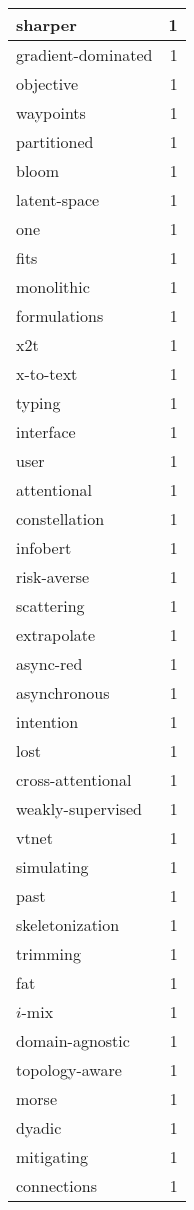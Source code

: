 \begin{table}[h]
\begin{tabular}{|l|r|}
\hline
sharper & 1 \\
\hline
gradient-dominated & 1 \\
\hline
objective & 1 \\
\hline
waypoints & 1 \\
\hline
partitioned & 1 \\
\hline
bloom & 1 \\
\hline
latent-space & 1 \\
\hline
one & 1 \\
\hline
fits & 1 \\
\hline
monolithic & 1 \\
\hline
formulations & 1 \\
\hline
x2t & 1 \\
\hline
x-to-text & 1 \\
\hline
typing & 1 \\
\hline
interface & 1 \\
\hline
user & 1 \\
\hline
attentional & 1 \\
\hline
constellation & 1 \\
\hline
infobert & 1 \\
\hline
risk-averse & 1 \\
\hline
scattering & 1 \\
\hline
extrapolate & 1 \\
\hline
async-red & 1 \\
\hline
asynchronous & 1 \\
\hline
intention & 1 \\
\hline
lost & 1 \\
\hline
cross-attentional & 1 \\
\hline
weakly-supervised & 1 \\
\hline
vtnet & 1 \\
\hline
simulating & 1 \\
\hline
past & 1 \\
\hline
skeletonization & 1 \\
\hline
trimming & 1 \\
\hline
fat & 1 \\
\hline
$i$-mix & 1 \\
\hline
domain-agnostic & 1 \\
\hline
topology-aware & 1 \\
\hline
morse & 1 \\
\hline
dyadic & 1 \\
\hline
mitigating & 1 \\
\hline
connections & 1 \\

\end{tabular}
\end{table}
